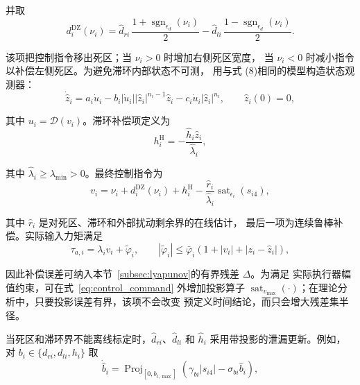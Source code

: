 \documentclass{article}
\begin{document}
并取
\begin{equation}
 d_{i}^{\mathrm{DZ}}(\nu_i)=
 \hat d_{ri}\,\frac{1+\operatorname{sgn}_{\epsilon_d}(\nu_i)}{2}
 -\hat d_{li}\,\frac{1-\operatorname{sgn}_{\epsilon_d}(\nu_i)}{2}.

 \tag{54}
\label{eq:dz_comp}
\end{equation}

该项把控制指令移出死区；当 $\nu_i>0$ 时增加右侧死区宽度，
当 $\nu_i<0$ 时减小指令以补偿左侧死区。为避免滞环内部状态不可测，
用与式 (8)相同的模型构造状态观测器：
\begin{equation}
 \dot{\hat z}_i=a_i\dot u_i-b_i|\dot u_i||\hat z_i|^{n_i-1}\hat z_i
 -c_i\dot u_i|\hat z_i|^{n_i},
 \qquad \hat z_i(0)=0,

 \tag{55}
\label{eq:hysteresis_observer}
\end{equation}

其中 $u_i=\mathcal D(v_i)$。滞环补偿项定义为
\begin{equation}
 h_i^{\mathrm{H}}=-\frac{\hat h_i\hat z_i}{\hat\lambda_i},

 \tag{56}
\label{eq:h_comp}
\end{equation}

其中 $\hat\lambda_i\geq\lambda_{\min}>0$。最终控制指令为
\begin{equation}
 v_i=\nu_i+d_i^{\mathrm{DZ}}(\nu_i)+h_i^{\mathrm{H}}
 -\frac{\hat r_i}{\hat\lambda_i}
 \operatorname{sat}_{\epsilon_i}(s_{i4}),

 \tag{57}
\label{eq:control_command}
\end{equation}

其中 $\hat r_i$ 是对死区、滞环和外部扰动剩余界的在线估计，
最后一项为连续鲁棒补偿。实际输入力矩满足
\begin{equation}
 \tau_{a,i}=\lambda_i v_i+\widetilde\varphi_i,
 \qquad
 |\widetilde\varphi_i|\leq\bar\varphi_i
 (1+|v_i|+|z_i-\hat z_i|),

 \tag{58}
\label{eq:actuator_residual}
\end{equation}

因此补偿误差可纳入本节~\ref{subsec:lyapunov}的有界残差 $\Delta$。为满足
实际执行器幅值约束，可在式~\eqref{eq:control_command} 外增加投影算子
$\operatorname{sat}_{v_{\max}}(\cdot)$；在理论分析中，只要投影误差有界，该项不会改变
预定义时间结论，而只会增大残差集半径。

当死区和滞环界不能离线标定时，$\hat d_{ri}$、$\hat d_{li}$ 和 $\hat h_i$
采用带投影的泄漏更新。例如，对 $b_i\in\{d_{ri},d_{li},h_i\}$ 取
\begin{equation}
 \dot{\hat b}_i=\operatorname{Proj}_{[0,b_{i,\max}]}
 \left(\gamma_{bi}|s_{i4}|-\sigma_{bi}\hat b_i\right),

 \tag{59}
\label{eq:actuator_parameter_adaptation}
\end{equation}
\end{document}
